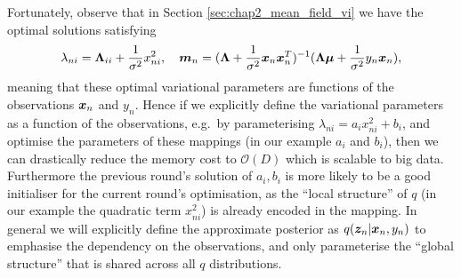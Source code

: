 Fortunately, observe that in Section \ref{sec:chap2_mean_field_vi} we have the optimal solutions satisfying
\begin{equation*}
\lambda_{ni} = \bm{\Lambda}_{ii} + \frac{1}{\sigma^2} x_{ni}^2, \quad \bm{m}_n = (\bm{\Lambda} + \frac{1}{\sigma^2} \bm{x}_n \bm{x}_n^T )^{-1} (\bm{\Lambda} \bm{\mu} + \frac{1}{\sigma^2} y_n \bm{x}_n),
\end{equation*}
meaning that these optimal variational parameters are functions of the observations $\bm{x}_n$ and $y_n$. Hence if we explicitly define the variational parameters as a function of the observations, e.g.~by parameterising $\lambda_{ni} = a_i x_{ni}^{2} + b_i$, and optimise the parameters of these mappings (in our example $a_i$ and $b_i$), then we can drastically reduce the memory cost to $\mathcal{O}(D)$ which is scalable to big data. Furthermore the previous round's solution of $a_i, b_i$ is more likely to be a good initialiser for the current round's optimisation, as the ``local structure'' of $q$ (in our example the quadratic term $x_{ni}^2$) is already encoded in the mapping. In general we will explicitly define the approximate posterior as $q(\bm{z}_n | \bm{x}_n, y_n)$ to emphasise the dependency on the observations, and only parameterise the ``global structure'' that is shared across all $q$ distributions. 

